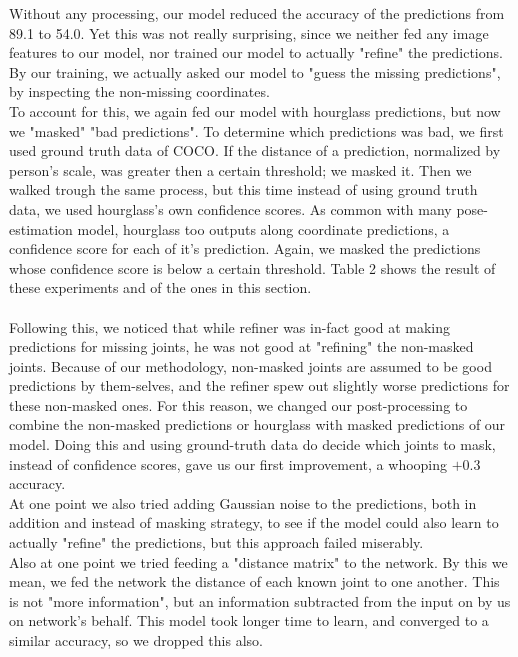 \documentclass[titlepage, a4paper, 14pt]{extarticle} %
\begin{document}
Without any processing, our model reduced the accuracy of the predictions from 89.1 to 54.0. Yet this was not really surprising, since we neither fed any image features to our model, nor trained our model to actually "refine" the predictions. By our training, we actually asked our model to "guess the missing predictions", by inspecting the non-missing coordinates. \\

To account for this, we again fed our model with hourglass predictions, but now we "masked" "bad predictions". To determine which predictions was bad, we first used ground truth data of COCO. If the distance of a prediction, normalized by person's scale, was greater then a certain threshold; we masked it. Then we walked trough the same process, but this time instead of using ground truth data, we used hourglass's own confidence scores. As common with many pose-estimation model, hourglass too outputs along coordinate predictions, a confidence score for each of it's prediction. Again, we masked the predictions whose confidence score is below a certain threshold. Table 2 shows the result of these experiments and of the ones in this section. \\\\

Following this, we noticed that while refiner was in-fact good at making predictions for missing joints, he was not good at "refining" the non-masked joints. Because of our methodology, non-masked joints are assumed to be good predictions by them-selves, and the refiner spew out slightly worse predictions for these non-masked ones. For this reason, we changed our post-processing to combine the non-masked predictions or hourglass with masked predictions of our model. Doing this and using ground-truth data do decide which joints to mask, instead of confidence scores, gave us our first improvement, a whooping $+0.3$ accuracy. \\

At one point we also tried adding Gaussian noise to the predictions, both in addition and instead of masking strategy, to see if the model could also learn to actually "refine" the predictions, but this approach failed miserably. \\ 

Also at one point we tried feeding a "distance matrix" to the network. By this we mean, we fed the network the distance of each known joint to one another. This is not "more information", but an information subtracted from the input on by us on network's behalf. This model took longer time to learn, and converged to a similar accuracy, so we dropped this also.
\end{document}

